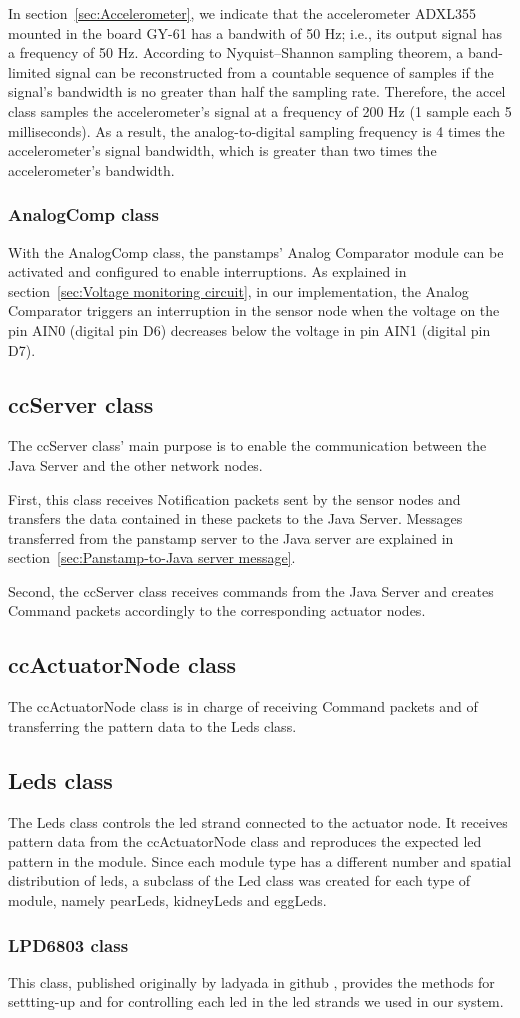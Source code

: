 In section~\ref{sec:Accelerometer}, we indicate that the accelerometer ADXL355 mounted in the board GY-61 has a bandwith of 50 Hz; i.e., its output signal has a frequency of 50 Hz. According to Nyquist–Shannon sampling theorem, a band-limited signal can be reconstructed from a countable sequence of samples if the signal's bandwidth is no greater than half the sampling rate. Therefore, the accel class samples the accelerometer's signal at a frequency of 200 Hz (1 sample each 5 milliseconds). As a result, the analog-to-digital sampling frequency is 4 times the accelerometer's signal bandwidth, which is greater than two times the accelerometer's bandwidth. 

\subsubsection{AnalogComp class}
With the AnalogComp class, the panstamps' Analog Comparator module can be activated and configured to enable interruptions. As explained in section~\ref{sec:Voltage monitoring circuit}, in our implementation, the Analog Comparator triggers an interruption in the sensor node when the voltage on the pin AIN0 (digital pin D6) decreases below the voltage in pin AIN1 (digital pin D7). 

\subsection{ccServer class}
The ccServer class' main purpose is to enable the communication between the Java Server and the other network nodes. 

First, this class receives Notification packets sent by the sensor nodes and transfers the data contained in these packets to the Java Server. Messages transferred from the panstamp server to the Java server are explained in section~\ref{sec:Panstamp-to-Java server message}. 

Second, the ccServer class receives commands from the Java Server and creates Command packets accordingly to the corresponding actuator nodes. 

\subsection{ccActuatorNode class}	
The ccActuatorNode class is in charge of receiving Command packets and of transferring the pattern data to the Leds class.  			

\subsection{Leds class}	
The Leds class controls the led strand connected to the actuator node. It receives pattern data from the ccActuatorNode class and reproduces the expected led pattern in the module. Since each module type has a different number and spatial distribution of leds, a subclass of the Led class was created for each type of module, namely pearLeds, kidneyLeds and eggLeds. 

\subsubsection{LPD6803 class}	
This class, published originally by ladyada in github \cite{lady_ada_LPD6803}, provides the methods for settting-up and for controlling each led in the led strands we used in our system. 






